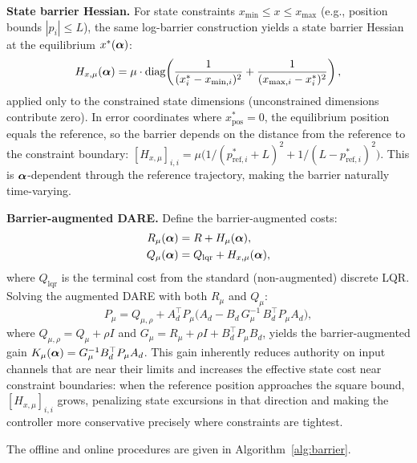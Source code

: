 \textbf{State barrier Hessian.}
For state constraints $x_{\min} \leq x \leq x_{\max}$
(e.g., position bounds $|p_i| \leq L$),
the same log-barrier construction yields a state barrier Hessian
at the equilibrium $x^*(\bm{\alpha})$:
\begin{equation}\label{eq:barrier_hess_x}
  H_{x,\mu}(\bm{\alpha}) = \mu \cdot \mathrm{diag}\!\left(
    \frac{1}{(x^*_i - x_{\min,i})^2}
    + \frac{1}{(x_{\max,i} - x^*_i)^2}
  \right),
\end{equation}
applied only to the constrained state dimensions
(unconstrained dimensions contribute zero).
In error coordinates where $x^*_{\mathrm{pos}} = 0$,
the equilibrium position equals the reference, so the
barrier depends on the distance from the reference to
the constraint boundary:
$[H_{x,\mu}]_{i,i} = \mu \bigl(
  1/(p^*_{\mathrm{ref},i} + L)^2 + 1/(L - p^*_{\mathrm{ref},i})^2
\bigr)$.
This is $\bm{\alpha}$-dependent through the reference trajectory,
making the barrier naturally time-varying.

\textbf{Barrier-augmented DARE.}
Define the barrier-augmented costs:
\begin{align}
  R_\mu(\bm{\alpha}) &= R + H_\mu(\bm{\alpha}), \label{eq:R_barrier} \\
  Q_\mu(\bm{\alpha}) &= Q_{\mathrm{lqr}} + H_{x,\mu}(\bm{\alpha}), \label{eq:Q_barrier}
\end{align}
where $Q_{\mathrm{lqr}}$ is the terminal cost from the
standard (non-augmented) discrete LQR.
Solving the augmented DARE with both $R_\mu$ and $Q_\mu$:
\begin{equation}\label{eq:dare_barrier}
  P_\mu = Q_{\mu,\rho} + A_d^\top P_\mu \bigl(
    A_d - B_d \, G_\mu^{-1} \,
    B_d^\top P_\mu A_d \bigr),
\end{equation}
where $Q_{\mu,\rho} = Q_\mu + \rho I$ and
$G_\mu = R_\mu + \rho I + B_d^\top P_\mu B_d$,
yields the barrier-augmented gain
$K_\mu(\bm{\alpha}) = G_\mu^{-1} B_d^\top P_\mu A_d$.
This gain inherently reduces authority on input channels
that are near their limits and increases the effective
state cost near constraint boundaries:
when the reference position approaches the square bound,
$[H_{x,\mu}]_{i,i}$ grows, penalizing state excursions
in that direction and making the controller more conservative
precisely where constraints are tightest.

The offline and online procedures are given
in Algorithm~\ref{alg:barrier}.

